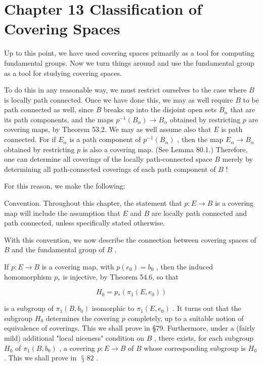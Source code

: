\documentclass[10pt]{article}
\begin{document}
\section*{Chapter 13 Classification of Covering Spaces}

Up to this point, we have used covering spaces primarily as a tool for computing fundamental groups. Now we turn things around and use the fundamental group as a tool for studying covering spaces.

To do this in any reasonable way, we must restrict ourselves to the case where \(B\) is locally path connected. Once we have done this, we may as well require \(B\) to be path connected as well, since \(B\) breaks up into the disjoint open sets \({B}_{\alpha }\) that are its path components, and the maps \({p}^{-1}\left( {B}_{\alpha }\right)  \rightarrow  {B}_{\alpha }\) obtained by restricting \(p\) are covering maps, by Theorem 53.2. We may as well assume also that \(E\) is path connected. For if \({E}_{\alpha }\) is a path component of \({p}^{-1}\left( {B}_{\alpha }\right)\) , then the map \({E}_{\alpha } \rightarrow  {B}_{\alpha }\) obtained by restricting \(p\) is also a covering map. (See Lemma 80.1.) Therefore, one can determine all coverings of the locally path-connected space \(B\) merely by determining all path-connected coverings of each path component of \(B\) !

For this reason, we make the following:

Convention. Throughout this chapter, the statement that \(p : E \rightarrow  B\) is a covering map will include the assumption that \(E\) and \(B\) are locally path connected and path connected, unless specifically stated otherwise.

With this convention, we now describe the connection between covering spaces of \(B\) and the fundamental group of \(B\) .

If \(p : E \rightarrow  B\) is a covering map, with \(p\left( {e}_{0}\right)  = {b}_{0}\) , then the induced homomorphism \({p}_{ * }\) is injective, by Theorem 54.6, so that

\[
{H}_{0} = {p}_{ * }\left( {{\pi }_{1}\left( {E,{e}_{0}}\right) }\right)
\]

is a subgroup of \({\pi }_{1}\left( {B,{b}_{0}}\right)\) isomorphic to \({\pi }_{1}\left( {E,{e}_{0}}\right)\) . It turns out that the subgroup \({H}_{0}\) determines the covering \(p\) completely, up to a suitable notion of equivalence of coverings. This we shall prove in §79. Furthermore, under a (fairly mild) additional "local niceness" condition on \(B\) , there exists, for each subgroup \({H}_{0}\) of \({\pi }_{1}\left( {B,{b}_{0}}\right)\) , a covering \(p : E \rightarrow  B\) of \(B\) whose corresponding subgroup is \({H}_{0}\) . This we shall prove in \(\text{ § }{82}\) .
\end{document}
